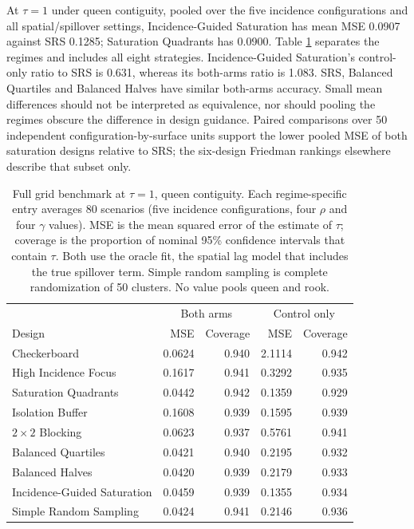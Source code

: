 \documentclass[11pt]{article}
\begin{document}
At \(\tau=1\) under queen contiguity, pooled over the five incidence
configurations and all spatial/spillover settings, Incidence-Guided Saturation has
mean MSE 0.0907 against SRS 0.1285; Saturation Quadrants has 0.0900. Table
\ref{tab:grid-srs} separates the regimes and includes all eight
strategies. Incidence-Guided Saturation's control-only ratio to SRS is 0.631,
whereas its both-arms ratio is 1.083. SRS, Balanced Quartiles and
Balanced Halves have similar both-arms accuracy. Small mean differences
should not be interpreted as equivalence, nor should pooling the regimes
obscure the difference in design guidance. Paired comparisons over 50
independent configuration-by-surface units support the lower pooled MSE
of both saturation designs relative to SRS; the six-design Friedman
rankings elsewhere describe that subset only.

\begin{table}[!htb]

\small
\centering

\caption{Full grid benchmark at $\tau=1$, queen contiguity. Each regime-specific entry averages 80 scenarios (five incidence configurations, four $\rho$ and four $\gamma$ values). MSE is the mean squared error of the estimate of $\tau$; coverage is the proportion of nominal 95\% confidence intervals that contain $\tau$. Both use the oracle fit, the spatial lag model that includes the true spillover term. Simple random sampling is complete randomization of 50 clusters. No value pools queen and rook.}
\label{tab:grid-srs}

\begin{tabular}{lrrrr}

\toprule
& \multicolumn{2}{c}{Both arms} & \multicolumn{2}{c}{Control only} \\
Design & MSE & Coverage & MSE & Coverage \\

\midrule
Checkerboard & 0.0624 & 0.940 & 2.1114 & 0.942 \\
High Incidence Focus & 0.1617 & 0.941 & 0.3292 & 0.935 \\
Saturation Quadrants & 0.0442 & 0.942 & 0.1359 & 0.929 \\
Isolation Buffer & 0.1608 & 0.939 & 0.1595 & 0.939 \\
$2\times2$ Blocking & 0.0623 & 0.937 & 0.5761 & 0.941 \\
Balanced Quartiles & 0.0421 & 0.940 & 0.2195 & 0.932 \\
Balanced Halves & 0.0420 & 0.939 & 0.2179 & 0.933 \\
Incidence-Guided Saturation & 0.0459 & 0.939 & 0.1355 & 0.934 \\
Simple Random Sampling & 0.0424 & 0.941 & 0.2146 & 0.936 \\

\bottomrule

\end{tabular}

\end{table}
\end{document}
